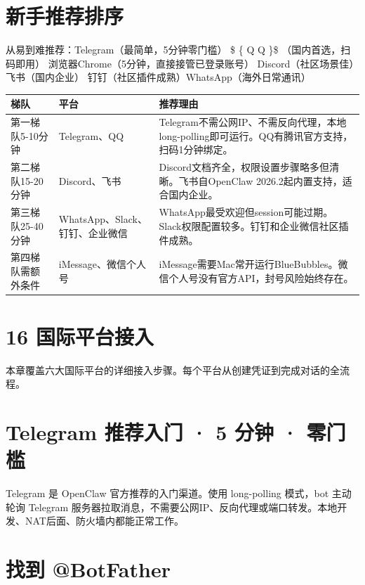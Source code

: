 \documentclass[
  10
]{article}
\newcounter{none} %
\begin{document}
\section{新手推荐排序}\label{ux65b0ux624bux63a8ux8350ux6392ux5e8f}

从易到难推荐：Telegram（最简单，5分钟零门槛） \$ \{ \sf Q Q \}\$
（国内首选，扫码即用） 浏览器Chrome（5分钟，直接接管已登录账号）
Discord（社区场景佳） 飞书（国内企业）
钉钉（社区插件成熟）WhatsApp（海外日常通讯）

{\def\LTcaptype{none} %
\begin{longtable}[]{@{}|l|l|l|@{}}
\toprule\noalign{}
\endhead
\bottomrule\noalign{}
\endlastfoot
\hline
梯队 & 平台 & 推荐理由 \\
\hline
第一梯队5-10分钟 & Telegram、QQ &
Telegram不需公网IP、不需反向代理，本地long-polling即可运行。QQ有腾讯官方支持，扫码1分钟绑定。 \\
\hline
第二梯队15-20分钟 & Discord、飞书 &
Discord文档齐全，权限设置步骤略多但清晰。飞书自OpenClaw
2026.2起内置支持，适合国内企业。 \\
\hline
第三梯队25-40分钟 & WhatsApp、Slack、钉钉、企业微信 &
WhatsApp最受欢迎但session可能过期。Slack权限配置较多。钉钉和企业微信社区插件成熟。 \\
\hline
第四梯队需额外条件 & iMessage、微信个人号 &
iMessage需要Mac常开运行BlueBubbles。微信个人号没有官方API，封号风险始终存在。 \\
\hline
\end{longtable}
}

\section{16 国际平台接入}\label{ux56fdux9645ux5e73ux53f0ux63a5ux5165}

本章覆盖六大国际平台的详细接入步骤。每个平台从创建凭证到完成对话的全流程。

\section{Telegram 推荐⼊⻔ · 5 分钟 ·
零⻔槛}\label{telegram-ux63a8ux8350-5-ux5206ux949f-ux96f6ux69db}

Telegram 是 OpenClaw 官方推荐的入门渠道。使用 long-polling 模式，bot
主动轮询 Telegram
服务器拉取消息，不需要公网IP、反向代理或端口转发。本地开发、NAT后面、防火墙内都能正常工作。

\section{找到 @BotFather}\label{ux627eux5230-botfather}
\end{document}
